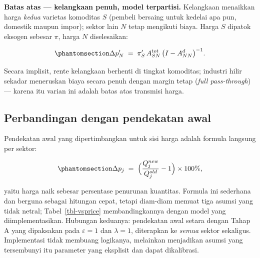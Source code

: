 \documentclass[
  manuscript=article,
  layout=publish,
  year=2026,
  volume=1,
]{den}
\begin{document}
\textbf{Batas atas --- kelangkaan penuh, model terpartisi.} Kelangkaan
menaikkan harga \emph{kedua} varietas komoditas \(S\) (pembeli bersaing
untuk kedelai apa pun, domestik maupun impor); sektor lain \(N\) tetap
mengikuti biaya. Harga \(S\) dipatok eksogen sebesar \(\pi\), harga
\(N\) diselesaikan:

\begin{equation}\phantomsection\label{eq-partition}{
\Delta p_N' \;=\; \pi_S' \, A^{tot}_{SN} \,
\bigl(I - A^{d}_{NN}\bigr)^{-1}.
}\end{equation}

Secara implisit, rente kelangkaan berhenti di tingkat komoditas;
industri hilir sekadar meneruskan biaya secara penuh dengan margin tetap
(\emph{full pass-through}) --- karena itu varian ini adalah batas atas
transmisi harga.

\subsection{Perbandingan dengan pendekatan
awal}\label{perbandingan-dengan-pendekatan-awal}

Pendekatan awal yang dipertimbangkan untuk sisi harga adalah formula
langsung per sektor:

\begin{equation}\phantomsection\label{eq-naive}{
\Delta p_j \;=\; \Bigl(\frac{Q^{new}_j}{Q^{old}_j} - 1\Bigr) \times 100\%,
}\end{equation}

yaitu harga naik sebesar persentase penurunan kuantitas. Formula ini
sederhana dan berguna sebagai hitungan cepat, tetapi diam-diam memuat
tiga asumsi yang tidak netral; Tabel~\ref{tbl-vsprice} membandingkannya
dengan model yang diimplementasikan. Hubungan keduanya: pendekatan awal
setara dengan Tahap A yang dipaksakan pada \(\varepsilon = 1\) dan
\(\lambda = 1\), diterapkan ke \emph{semua} sektor sekaligus.
Implementasi tidak membuang logikanya, melainkan menjadikan asumsi yang
tersembunyi itu parameter yang eksplisit dan dapat dikalibrasi.
\end{document}
